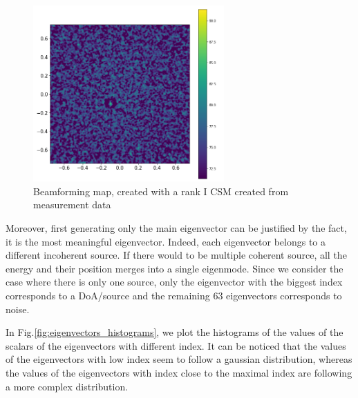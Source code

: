 \documentclass{article}
\begin{document}
\begin{figure}
    \centering
    \includegraphics[width=0.65\textwidth]{../figs/measurement_sample_rank_I_beamforming.png}
    \caption{Beamforming map, created with a rank I CSM created from measurement data}
    \label{fig:measurement_sample_rank_I_beamforming}
\end{figure}



Moreover, first generating only the main eigenvector can be justified by the fact, it is the most meaningful eigenvector. Indeed, each eigenvector belongs to a different incoherent source. If there would to be  multiple coherent source, all the energy and their position merges into a single eigenmode. Since we consider the case where there is only one source, only the eigenvector with the biggest index corresponds to a DoA/source and the remaining 63 eigenvectors corresponds to noise.  

In Fig.\ref{fig:eigenvectors_histograms}, we plot the histograms of the values of the scalars of the eigenvectors with different index. It can be noticed that the values of the eigenvectors with low index seem to follow a gaussian distribution, whereas the values of the eigenvectors with index close to the maximal index are following a more complex distribution.
\end{document}
